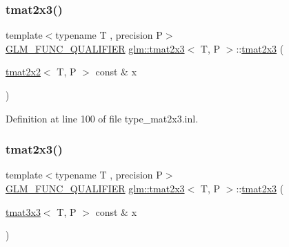 \mbox{\label{structglm_1_1tmat2x3_a3bc2693e1ce02cbd48703e2c7c6f75d6}} 
\subsubsection{\texorpdfstring{tmat2x3()}{tmat2x3()}\hspace{0.1cm}{\footnotesize\ttfamily [11/22]}}
{\footnotesize\ttfamily template$<$typename T , precision P$>$ \\
\mbox{\hyperlink{setup_8hpp_a33fdea6f91c5f834105f7415e2a64407}{G\+L\+M\+\_\+\+F\+U\+N\+C\+\_\+\+Q\+U\+A\+L\+I\+F\+I\+ER}} \mbox{\hyperlink{structglm_1_1tmat2x3}{glm\+::tmat2x3}}$<$ T, P $>$\+::\mbox{\hyperlink{structglm_1_1tmat2x3}{tmat2x3}} (\begin{DoxyParamCaption}\item[{\mbox{\hyperlink{structglm_1_1tmat2x2}{tmat2x2}}$<$ T, P $>$ const \&}]{x }\end{DoxyParamCaption})}



Definition at line 100 of file type\+\_\+mat2x3.\+inl.

\mbox{\label{structglm_1_1tmat2x3_a8c8c9b6b9ab00983351a4ffa5f1c1c80}} 
\subsubsection{\texorpdfstring{tmat2x3()}{tmat2x3()}\hspace{0.1cm}{\footnotesize\ttfamily [12/22]}}
{\footnotesize\ttfamily template$<$typename T , precision P$>$ \\
\mbox{\hyperlink{setup_8hpp_a33fdea6f91c5f834105f7415e2a64407}{G\+L\+M\+\_\+\+F\+U\+N\+C\+\_\+\+Q\+U\+A\+L\+I\+F\+I\+ER}} \mbox{\hyperlink{structglm_1_1tmat2x3}{glm\+::tmat2x3}}$<$ T, P $>$\+::\mbox{\hyperlink{structglm_1_1tmat2x3}{tmat2x3}} (\begin{DoxyParamCaption}\item[{\mbox{\hyperlink{structglm_1_1tmat3x3}{tmat3x3}}$<$ T, P $>$ const \&}]{x }\end{DoxyParamCaption})}



